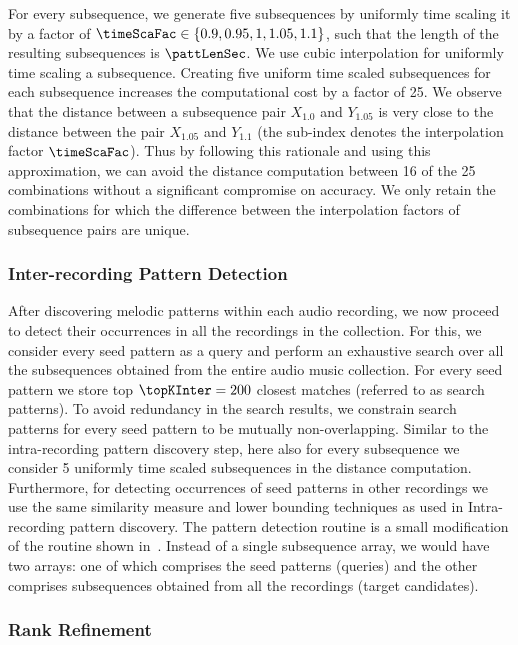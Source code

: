For every subsequence, we generate five subsequences by uniformly time scaling it by a factor of $\timeScaFac \in \lbrace 0.9, 0.95, 1, 1.05, 1.1\rbrace$, such that the length of the resulting subsequences is $\pattLenSec$. We use cubic interpolation for uniformly time scaling a subsequence. Creating five uniform time scaled subsequences for each subsequence increases the computational cost by a factor of 25. We observe that the distance between a subsequence pair $X_{1.0}$ and $Y_{1.05}$ is very close to the distance between the pair $X_{1.05}$ and $Y_{1.1}$ (the sub-index denotes the interpolation factor $\timeScaFac$). Thus by following this rationale and using this approximation, we can avoid the distance computation between 16 of the 25 combinations without a significant compromise on accuracy. We only retain the combinations for which the difference between the interpolation factors of subsequence pairs are unique.

\subsubsection{Inter-recording Pattern Detection}
\label{sec:inter_recording_pattern_search}

After discovering melodic patterns within each audio recording, we now proceed to detect their occurrences in all the recordings in the collection. For this, we consider every seed pattern as a query and perform an exhaustive search over all the subsequences obtained from the entire audio music collection. For every seed pattern we store top $\topKInter=200$ closest matches (referred to as search patterns). To avoid redundancy in the search results, we constrain search patterns for every seed pattern to be mutually non-overlapping. Similar to the intra-recording pattern discovery step, here also for every subsequence we consider 5 uniformly time scaled subsequences in the distance computation. Furthermore, for detecting occurrences of seed patterns in other recordings we use the same similarity measure and lower bounding techniques as used in Intra-recording pattern discovery. The pattern detection routine is a small modification of the routine shown in~. Instead of a single subsequence array, we would have two arrays: one of which comprises the seed patterns (queries) and the other comprises subsequences obtained from all the recordings (target candidates). 

\subsubsection{Rank Refinement}
\label{sec:rankRefinement}

